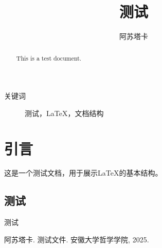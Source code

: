 \documentclass{article}
\title{测试}
\author{阿苏塔卡}
\affil{安徽大学哲学学院}
\begin{document}
\maketitle
\begin{abstract}
This is a test document.
\end{abstract}
\begin{description}
\item[关键词] 测试，LaTeX，文档结构
\end{description}
\section{引言}
这是一个测试文档，用于展示LaTeX的基本结构\cite{1}。
\subsection{测试}
测试
\begin{thebibliography}{114514}
 阿苏塔卡. 测试文件. 安徽大学哲学学院, 2025.
\end{thebibliography}
\end{document}
